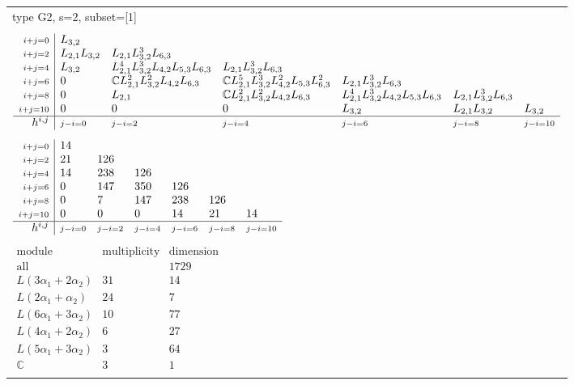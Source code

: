 \documentclass[crop,border=2mm]{standalone}
\begin{document}
\begin{tabular}{l}
{\huge type G2, s=2, subset=[1]}\\ \\


$\displaystyle
\begin{array}{r|l l l l l l}
	{\scriptstyle i+j=0}&L_{3,2}&&&&&\\
	{\scriptstyle i+j=2}&L_{2,1}L_{3,2}&L_{2,1}L_{3,2}^{3}L_{6,3}&&&&\\
	{\scriptstyle i+j=4}&L_{3,2}&L_{2,1}^{4}L_{3,2}^{3}L_{4,2}L_{5,3}L_{6,3}&L_{2,1}L_{3,2}^{3}L_{6,3}&&&\\
	{\scriptstyle i+j=6}&0&\mathbb{C}L_{2,1}^{2}L_{3,2}^{2}L_{4,2}L_{6,3}&\mathbb{C}L_{2,1}^{5}L_{3,2}^{3}L_{4,2}^{2}L_{5,3}L_{6,3}^{2}&L_{2,1}L_{3,2}^{3}L_{6,3}&&\\
	{\scriptstyle i+j=8}&0&L_{2,1}&\mathbb{C}L_{2,1}^{2}L_{3,2}^{2}L_{4,2}L_{6,3}&L_{2,1}^{4}L_{3,2}^{3}L_{4,2}L_{5,3}L_{6,3}&L_{2,1}L_{3,2}^{3}L_{6,3}&\\
	{\scriptstyle i+j=10}&0&0&0&L_{3,2}&L_{2,1}L_{3,2}&L_{3,2}\\
	\hline h^{i,j}&{\scriptstyle j-i=0}&{\scriptstyle j-i=2}&{\scriptstyle j-i=4}&{\scriptstyle j-i=6}&{\scriptstyle j-i=8}&{\scriptstyle j-i=10}
\end{array}
$ \\ \\


$\displaystyle
\begin{array}{r|l l l l l l}
	{\scriptstyle i+j=0}&14&&&&&\\
	{\scriptstyle i+j=2}&21&126&&&&\\
	{\scriptstyle i+j=4}&14&238&126&&&\\
	{\scriptstyle i+j=6}&0&147&350&126&&\\
	{\scriptstyle i+j=8}&0&7&147&238&126&\\
	{\scriptstyle i+j=10}&0&0&0&14&21&14\\
	\hline h^{i,j}&{\scriptstyle j-i=0}&{\scriptstyle j-i=2}&{\scriptstyle j-i=4}&{\scriptstyle j-i=6}&{\scriptstyle j-i=8}&{\scriptstyle j-i=10}
\end{array}
$ \\ \\


$\displaystyle
\begin{array}{rll}
	\text{module}&\text{multiplicity}&\text{dimension} \\ \hline \text{all}&&1729 \\
	L\left( 3\alpha_{1}+ 2\alpha_{2}\right)&31&14\\
	L\left( 2\alpha_{1}+\alpha_{2}\right)&24&7\\
	L\left( 6\alpha_{1}+ 3\alpha_{2}\right)&10&77\\
	L\left( 4\alpha_{1}+ 2\alpha_{2}\right)&6&27\\
	L\left( 5\alpha_{1}+ 3\alpha_{2}\right)&3&64\\
	\mathbb{C}&3&1
\end{array}
$ \\ \\

\end{tabular}
\end{document}
